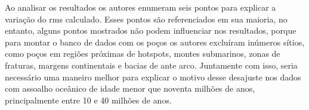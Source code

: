 \documentclass[manuscript]{geophysics}[10pt]
\begin{document}
Ao analisar os resultados os autores enumeram seis pontos para explicar a variação do rms calculado. Esses pontos são referenciados em sua maioria, no entanto, alguns pontos mostrados não podem influenciar nos resultados, porque para montar o banco de dados com os poços os autores excluíram inúmeros sítios, como poços em regiões próximas de hotspots, montes submarinos, zonas de fraturas, margens continentais e bacias de ante arco. Juntamente com isso, seria necessário uma maneiro melhor para explicar o motivo desse desajuste nos dados com assoalho oceânico de idade menor que noventa milhões de anos, principalmente entre 10 e 40 milhões de anos.




    
\end{document}
